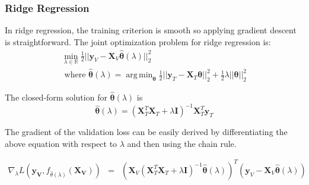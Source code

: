 \documentclass[10pt,letterpaper]{article}
\DeclareMathOperator*{\argmin}{arg\,min}
\begin{document}
\subsubsection{Ridge Regression}

In ridge regression, the training criterion is smooth so applying gradient descent is straightforward. The joint optimization problem for ridge regression is:
\begin{equation}
\begin{array}{c}
\min_{\lambda\in \mathbb{R}} \frac{1}{2} \lvert\lvert \boldsymbol{y}_V - \boldsymbol{X}_V \hat{\boldsymbol{\theta}} (\lambda) \rvert\rvert_2 ^2 \\
\text{  where  } \hat{\boldsymbol{\theta}} (\lambda) = \argmin_{\boldsymbol{\theta}} \frac{1}{2} \lvert\lvert \boldsymbol{y}_T - \boldsymbol{X}_T \boldsymbol{\theta} \rvert\rvert_2 ^2 + \frac{1}{2} \lambda \lvert\lvert \boldsymbol{\theta} \rvert\rvert_2^2
\end{array}
\end{equation}

The closed-form solution for $\hat{\boldsymbol{\theta}}(\lambda)$ is
\begin{equation}
\hat{\boldsymbol{\theta}} (\lambda) = (\boldsymbol{X}_T^T\boldsymbol{X}_T + \lambda \boldsymbol{I})^{-1}\boldsymbol{X}_T^T\boldsymbol{y}_T
\end{equation}

The gradient of the validation loss can be easily derived by differentiating the above equation with respect to $\lambda$ and then using the chain rule.

\begin{equation}
\begin{array} {lcl}
\nabla_{\lambda} L(\boldsymbol{y_V}, f_{\hat \theta(\lambda)}(\boldsymbol{X_V}))
&=& (\boldsymbol{X}_V(\boldsymbol{X}_T^T \boldsymbol{X}_T + \lambda \boldsymbol{I})^{-1}
\hat{\boldsymbol{\theta}}(\lambda))^T(\boldsymbol{y}_V - \boldsymbol{X}_V \hat{\boldsymbol{\theta}}(\lambda))
\end{array}
\end{equation}
\end{document}

